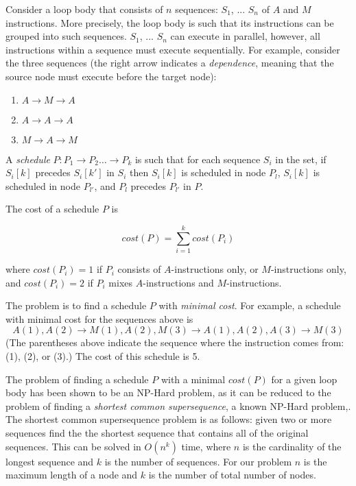 Consider a loop body that consists of $n$ sequences: $S_1$, ... $S_n$ of $A$ and $M$ instructions. 
More precisely, the loop body is such that its instructions can be grouped into such sequences. 
$S_1$, ... $S_n$ can execute in parallel, however, all instructions within a sequence must 
execute sequentially. For example, consider the three sequences (the right arrow indicates a \emph{dependence},
meaning that the source node must execute before the target node): 
\begin{enumerate}
\item $A \rightarrow M \rightarrow A$
\item $A \rightarrow A \rightarrow A$
\item $M \rightarrow A \rightarrow M$
\end{enumerate} 

A \emph{schedule} $P: P_1 \rightarrow P_2 \dots \rightarrow P_k$ is such that for each sequence 
$S_i$ in the set, if $S_i[k]$ precedes $S_i[k']$ in $S_i$ then $S_i[k]$ is scheduled in node $P_l$, $S_i[k]$ 
is scheduled in node $P_{l'}$, and $P_l$ precedes $P_{l'}$ in $P$. 

The cost of a schedule $P$ is 

\begin{equation}
\mathit{cost}(P) = \sum_{i=1}^k \mathit{cost}(P_i)
\end{equation}

where $\mathit{cost}(P_i) = 1$ if $P_i$ consists of $A$-instructions only, or $M$-instructions only, 
and $\mathit{cost}(P_i) = 2$ if $P_i$ mixes $A$-instructions and $M$-instructions. 

The problem is to find a schedule $P$ with \emph{minimal cost}. For example, 
a schedule with minimal cost for the sequences above is
\[ A(1), A(2) \rightarrow M(1), A(2), M(3) \rightarrow A(1), A(2), A(3) \rightarrow M(3) \]
(The parentheses above indicate the sequence where the instruction comes from: (1), (2), or (3).)
The cost of this schedule is 5. 

The problem of finding a schedule $P$ with a minimal $cost(P)$ for a given loop body has been shown
to be an NP-Hard problem, as it can be reduced to the problem of finding a \emph{shortest common supersequence}, 
a known NP-Hard problem\cite{Maier1978},\cite{Vazirani2010}. The shortest common supersequence problem is as follows: 
given two or more sequences find the the shortest sequence that contains all of the original sequences. This can be solved
in $O(n^k)$ time, where $n$ is the cardinality of the longest sequence and $k$ is the 
number of sequences. For our problem $n$ is the maximum length of a node and $k$ is the number
of total number of nodes. %

